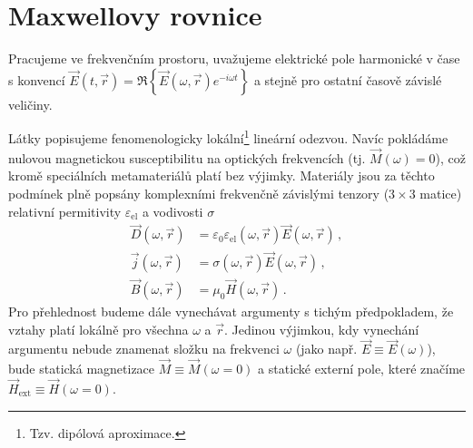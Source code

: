\section{Maxwellovy rovnice}
\label{chap:maxwellovy-rovnice}

Pracujeme ve frekvenčním prostoru, uvažujeme elektrické pole harmonické v čase s konvencí $\vec{E}(t,\vec{r})=\Re\left\lbrace\vec{E}(\omega,\vec{r}) e^{-i\omega t}\right\rbrace$ a stejně pro ostatní časově závislé veličiny.

Látky popisujeme fenomenologicky lokální\footnote{Tzv. dipólová aproximace.} lineární odezvou.
Navíc pokládáme nulovou magnetickou susceptibilitu na optických frekvencích (tj. $\vec{M}(\omega)=0$), což kromě speciálních metamateriálů platí bez výjimky\cite{lindenPhotonicMetamaterialsMagnetism2006}.
Materiály jsou za těchto podmínek plně popsány komplexními frekvenčně závislými tenzory ($3\times 3$ matice) relativní permitivity $\varepsilon_{\textrm{el}}$ a vodivosti $\sigma$
\begin{subequations}
\label{eqn:materialy}
\begin{align}
    \vec{D}(\omega,\vec{r})&=\varepsilon_0 \varepsilon_{\textrm{el}}(\omega,\vec{r})\vec{E}(\omega,\vec{r}) \,, \label{eqn:materialy-D} \\
    \vec{j}(\omega,\vec{r})&=\sigma(\omega,\vec{r})\vec{E}(\omega,\vec{r}) \,, \label{eqn:materialy-J} \\
    \vec{B}(\omega,\vec{r})&=\mu_0 \vec{H}(\omega,\vec{r})  \,. \label{eqn:materialy-B}
\end{align}
\end{subequations}
Pro přehlednost budeme dále vynechávat argumenty s tichým předpokladem, že vztahy platí lokálně pro všechna $\omega$ a $\vec{r}$.
Jedinou výjimkou, kdy vynechání argumentu nebude znamenat složku na frekvenci $\omega$ (jako např. $\vec{E}\equiv\vec{E}(\omega)$), bude statická magnetizace $\vec{M}\equiv\vec{M}(\omega=0)$ a statické externí pole, které značíme $\vec{H}_{\textrm{ext}}\equiv\vec{H}(\omega=0)$.


